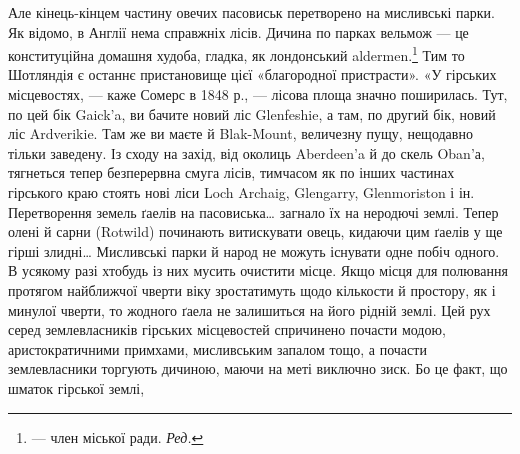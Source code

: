 Але кінець-кінцем частину овечих пасовиськ перетворено
на мисливські парки. Як відомо, в Англії нема справжніх лісів.
Дичина по парках вельмож — це конституційна домашня худоба,
гладка, як лондонський aldermen.\footnote*{
— член міської ради. \emph{Ред.}
} Тим то Шотляндія є останнє
пристановище цієї «благородної пристрасти». «У гірських місцевостях,
— каже Сомерс в 1848 р., — лісова площа значно
поширилась. Тут, по цей бік Gaick’a, ви бачите новий ліс Glenfeshie,
а там, по другий бік, новий ліс Ardverikie. Там же ви маєте
й Blak-Mount, величезну пущу, нещодавно тільки заведену.
Із сходу на захід, від околиць Aberdeen’a й до скель Oban’а,
тягнеться тепер безперервна смуга лісів, тимчасом як по інших
частинах гірського краю стоять нові ліси Loch Archaig, Glengarry,
Glenmoriston і ін. Перетворення земель ґаелів на пасовиська\dots{}
загнало їх на неродючі землі. Тепер олені й сарни (Rotwild)
починають витискувати овець, кидаючи цим ґаелів у ще
гірші злидні\dots{} Мисливські парки й народ не можуть існувати
одне побіч одного. В усякому разі хтобудь із них мусить очистити
місце. Якщо місця для полювання протягом найближчої чверти
віку зростатимуть щодо кількости й простору, як і минулої
чверти, то жодного ґаела не залишиться на його рідній землі.
Цей рух серед землевласників гірських місцевостей спричинено
почасти модою, аристократичними примхами, мисливським запалом
тощо, а почасти землевласники торгують дичиною, маючи
на меті виключно зиск. Бо це факт, що шматок гірської землі,
\parbreak{}  %
